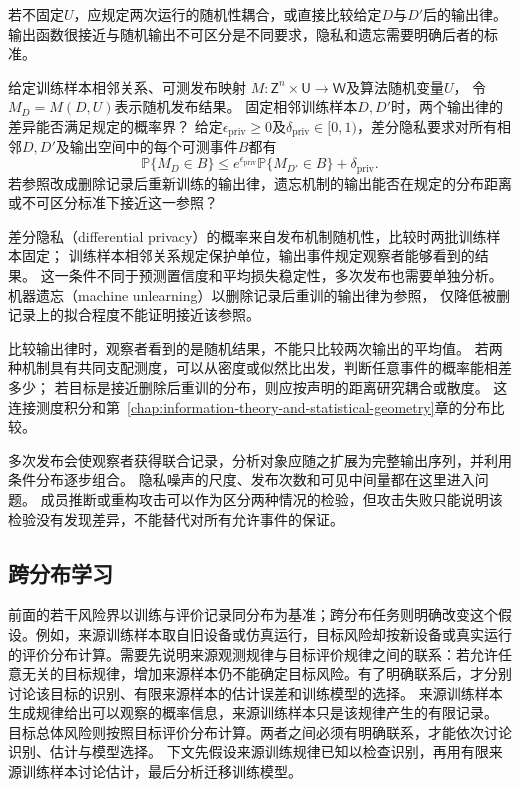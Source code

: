 若不固定$U$，应规定两次运行的随机性耦合，或直接比较给定$D$与$D'$后的输出律。
输出函数很接近与随机输出不可区分是不同要求，隐私和遗忘需要明确后者的标准。

\begin{mathproblem}[随机输出律的可区分程度]
  \label{question:future-output-law}
  给定训练样本相邻关系、可测发布映射
  $M:\mathsf Z^n\times\mathsf U\to\mathsf W$及算法随机变量$U$，
  令$M_D=M(D,U)$表示随机发布结果。
  固定相邻训练样本$D,D'$时，两个输出律的差异能否满足规定的概率界？
  给定$\epsilon_{\mathrm{priv}}\geq0$及$\delta_{\mathrm{priv}}\in[0,1)$，差分隐私要求对所有相邻$D,D'$及输出空间中的每个可测事件$B$都有
  \[
    \mathbb P\{M_D\in B\}
    \leq e^{\epsilon_{\mathrm{priv}}}
       \mathbb P\{M_{D'}\in B\}+\delta_{\mathrm{priv}}.
  \]
  若参照改成删除记录后重新训练的输出律，遗忘机制的输出能否在规定的分布距离
  或不可区分标准下接近这一参照？
\end{mathproblem}

差分隐私（differential privacy）的概率来自发布机制随机性，比较时两批训练样本固定；
训练样本相邻关系规定保护单位，输出事件规定观察者能够看到的结果。
这一条件不同于预测置信度和平均损失稳定性，多次发布也需要单独分析。
机器遗忘（machine unlearning）以删除记录后重训的输出律为参照，
仅降低被删记录上的拟合程度不能证明接近该参照。

比较输出律时，观察者看到的是随机结果，不能只比较两次输出的平均值。
若两种机制具有共同支配测度，可以从密度或似然比出发，判断任意事件的概率能相差多少；
若目标是接近删除后重训的分布，则应按声明的距离研究耦合或散度。
这连接测度积分和第~\ref{chap:information-theory-and-statistical-geometry}章的分布比较。

多次发布会使观察者获得联合记录，分析对象应随之扩展为完整输出序列，并利用条件分布逐步组合。
隐私噪声的尺度、发布次数和可见中间量都在这里进入问题。
成员推断或重构攻击可以作为区分两种情况的检验，但攻击失败只能说明该检验没有发现差异，不能替代对所有允许事件的保证。

\subsection{跨分布学习}
\label{sec:future-transfer-theory-map}

前面的若干风险界以训练与评价记录同分布为基准；跨分布任务则明确改变这个假设。例如，来源训练样本取自旧设备或仿真运行，目标风险却按新设备或真实运行的评价分布计算。需要先说明来源观测规律与目标评价规律之间的联系：若允许任意无关的目标规律，增加来源样本仍不能确定目标风险。有了明确联系后，才分别讨论该目标的识别、有限来源样本的估计误差和训练模型的选择。
来源训练样本生成规律给出可以观察的概率信息，来源训练样本只是该规律产生的有限记录。
目标总体风险则按照目标评价分布计算。两者之间必须有明确联系，才能依次讨论识别、估计与模型选择。
下文先假设来源训练规律已知以检查识别，再用有限来源训练样本讨论估计，最后分析迁移训练模型。

